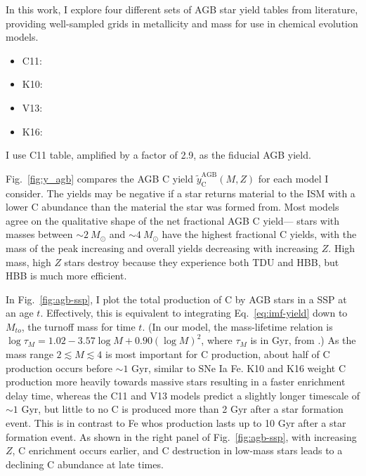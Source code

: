 \documentclass[12pt,oneside]{report}
\newcommand{\about}[1]{${\sim} #1$}
\begin{document}
In this work, I explore four different sets of AGB star yield tables from literature, providing well-sampled grids in metallicity and mass for use in chemical evolution models. 
\begin{itemize}
    \item C11: \citet{cristallo+11, cristallo+15}
    \item K10: \citet{karakas10}
    \item V13: \citet{ventura+13,ventura+14,ventura+18, ventura+20}
    \item K16: \citet{KL16} \citet{karakas+18}
\end{itemize}
I use C11 table, amplified by a factor of 2.9, as the fiducial AGB yield.

Fig.~\ref{fig:y_agb} compares the AGB C yield $\tilde{y}_\text{C}^\text{AGB}(M, Z)$ for each model I consider. 
The yields may be negative if a star returns material to the ISM with a lower C abundance than the material the star was formed from.
Most models agree on the qualitative shape of the net fractional AGB C yield---%
stars with masses between \about{2~M_\odot} and \about{4~M_\odot} have the highest fractional C yields, with the mass of the peak increasing and overall yields decreasing with increasing $Z$.  High mass, high $Z$ stars destroy  because they experience both TDU and HBB, but HBB is much more efficient.

In Fig.~\ref{fig:agb-ssp}, I plot the total production of C by AGB stars in a SSP at an age $t$. 
Effectively, this is equivalent to integrating Eq.~\ref{eq:imf-yield} down to $M_{to}$, the turnoff mass for time $t$.
({In our model, the mass-lifetime relation is
$\log \tau_M = 1.02 - 3.57\log M + 0.90 \left(\log M\right)^2$,
where $\tau_M$ is in Gyr,
from \citealt{larson74}.})
As the mass range $2\lesssim M \lesssim 4$ is most important for C production, about half of C production occurs before \about{1} Gyr, similar to SNe Ia Fe. 
K10 and K16 weight C production more heavily towards massive stars resulting in a faster enrichment delay time, whereas the C11 and V13 models predict a slightly longer timescale of \about{1} Gyr, but little to no C is produced more than 2 Gyr after a star formation event. This is in contrast to Fe whos production lasts up to 10 Gyr after a star formation event. As shown in the right panel of Fig.~\ref{fig:agb-ssp}, with increasing $Z$, C enrichment occurs earlier, and C destruction in low-mass stars leads to a declining C abundance at late times.
    
\end{document}
